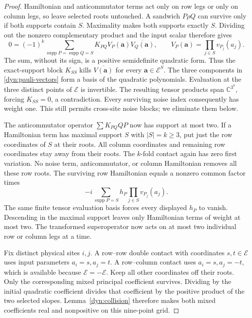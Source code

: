\documentclass[reqno]{amsart}
\theoremstyle{definition}
\theoremstyle{remark}
\newcommand{\C}{\mathbb C}
\DeclareMathOperator{\supp}{supp}
\begin{document}
\begin{proof}
Hamiltonian and anticommutator terms act only on row legs or only on column
legs, so leave selected roots untouched.  A sandwich $P\rho Q$ can survive
only if both supports contain $S$.  Maximality makes both supports exactly
$S$.  Dividing out the nonzero complementary product and the input scalar
therefore gives
\begin{equation}\label{dyn:psd-contact}
 0=(-1)^k\sum_{\supp P=\supp Q=S}
 K_{PQ}V_P(\boldsymbol a)\overline{V_Q(\boldsymbol a)},
 \qquad V_P(\boldsymbol a)=\prod_{j\in S}v_{P_j}(a_j).
\end{equation}
The sum, without its sign, is a positive semidefinite quadratic form.
Thus the exact-support block $K_{SS}$ kills
$\overline{V(\boldsymbol a)}$ for every $\boldsymbol a\in\mathcal E^S$.
The three components in \eqref{dyn:pauli-vectors} form a basis of the
quadratic polynomials.  Evaluation at the three distinct points of
$\mathcal E$ is invertible.  The resulting tensor products span
$\C^{3^k}$, forcing $K_{SS}=0$, a contradiction.  Every surviving noise
index consequently has weight one.  This still permits cross-site noise
blocks; we eliminate them below.

The anticommutator operator $\sum K_{PQ}QP$ now has support at most two.
If a Hamiltonian term has maximal support $S$ with $|S|=k\ge3$, put just
the row coordinates of $S$ at their roots.  All column coordinates and
remaining row coordinates stay away from their roots.  The $k$-fold
contact again has zero first variation.  No noise term, anticommutator,
or column Hamiltonian removes all these row roots.  The surviving row
Hamiltonian equals a nonzero common factor times
\[
 -i\sum_{\supp P=S}h_P\prod_{j\in S}v_{P_j}(a_j).
\]
The same finite tensor evaluation basis forces every displayed $h_P$ to
vanish.  Descending in the maximal support leaves only Hamiltonian terms
of weight at most two.  The transformed superoperator now acts on at most
two individual row or column legs at a time.

Fix distinct physical sites $i,j$.  A row--row double contact with coordinates
$s,t\in\mathcal E$ uses input parameters $a_i=s,a_j=t$.  A row--column
contact uses $a_i=s,a_j=-t$, which is available because $\mathcal E=-\mathcal E$.
Keep all other coordinates off their roots.  Only the corresponding mixed
principal coefficient survives.  Dividing by the initial quadratic
coefficient divides that coefficient by the positive product of the two
selected slopes.  Lemma~\ref{dyn:collision} therefore makes both mixed
coefficients real and nonpositive on this nine-point grid.


\end{proof}
\end{document}
